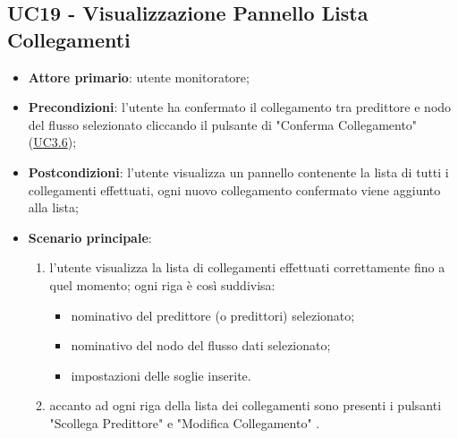 	

	\label{par:UC19}
	\subsection{UC19 - Visualizzazione Pannello Lista Collegamenti}
		\begin{itemize}
			\item\textbf{Attore primario}: utente monitoratore;
			\item\textbf{Precondizioni}: l’utente ha confermato il collegamento tra predittore e nodo del flusso selezionato cliccando il pulsante di "Conferma Collegamento" (\hyperref[par:UC3.6]{UC3.6});
			\item\textbf{Postcondizioni}: l’utente visualizza un pannello contenente la lista di tutti i collegamenti effettuati, ogni nuovo collegamento confermato viene aggiunto alla lista;
			\item\textbf{Scenario principale}:
				\begin{enumerate}
					\item l'utente visualizza la lista di collegamenti effettuati correttamente fino a quel momento; ogni riga è così suddivisa:
					\begin{itemize}
						\item nominativo del predittore (o predittori) selezionato;
						\item nominativo del nodo del flusso dati selezionato;
						\item impostazioni delle soglie inserite.
					\end{itemize}
					\item accanto ad ogni riga della lista dei collegamenti sono presenti i pulsanti "Scollega Predittore" e "Modifica Collegamento" .	
				\end{enumerate}		
		\end{itemize}


	\label{par:UC20}
